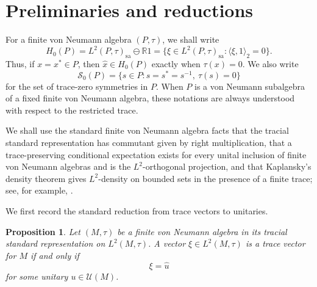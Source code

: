 \documentclass[11pt,letterpaper,reqno]{amsart}
\newtheorem{prop}[thm]{Proposition}
\theoremstyle{definition}
\numberwithin{equation}{section}
\newcommand{\sa}{\mathrm{sa}}
\newcommand{\RR}{\mathbb R}
\newcommand{\one}{1}
\begin{document}
\section{Preliminaries and reductions}\label{sec:preliminaries}

For a finite von Neumann algebra $(P,\tau)$, we shall write
\[
   H_0(P)
   =
   L^2(P,\tau)_{\sa}\ominus \RR\one
   =
   \{\xi\in L^2(P,\tau)_{\sa}:\langle \xi,\one\rangle_2=0\}.
\]
Thus, if $x=x^*\in P$, then $\widehat{x}\in H_0(P)$ exactly when
$\tau(x)=0$.  We also write
\[
   \mathcal S_0(P)
   =
   \{s\in P:s=s^*=s^{-1},\ \tau(s)=0\}
\]
for the set of trace-zero symmetries in $P$.  When $P$ is a von Neumann
subalgebra of a fixed finite von Neumann algebra, these notations are always
understood with respect to the restricted trace.

We shall use the standard finite von Neumann algebra facts that the tracial
standard representation has commutant given by right multiplication, that a
trace-preserving conditional expectation exists for every unital inclusion of
finite von Neumann algebras and is the \(L^2\)-orthogonal projection, and that
Kaplansky's density theorem gives \(L^2\)-density on bounded sets in the
presence of a finite trace; see, for example, \cite{Tak72,Tak02,KR97I,KR97II}.

We first record the standard reduction from trace vectors to unitaries.

\begin{prop}\label{prop:trace-vectors-unitaries}
Let \((M,\tau)\) be a finite von Neumann algebra in its tracial standard
representation on \(L^2(M,\tau)\). A vector \(\xi\in L^2(M,\tau)\) is a trace
vector for \(M\) if and only if
\[
   \xi=\widehat{u}
\]
for some unitary \(u\in\mathcal U(M)\).
\end{prop}
	
\end{document}
